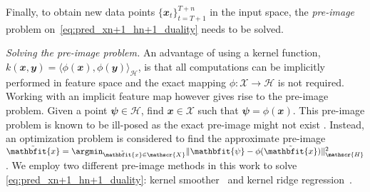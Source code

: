 
Finally, to obtain new data points $ \{\mathbfit{x}_t\}_{t=T+1} ^{T+n} $ in the input space, the \emph{pre-image} problem on~\eqref{eq:pred_xn+1_hn+1_duality} needs to be solved.

\emph{Solving the pre-image problem.} An advantage of using a kernel function, $ k(\mathbfit{x},\mathbfit{y}) = \langle\phi(\mathbfit{x}), \phi(\mathbfit{y}) \rangle_{\mathscr{H}} $, is that all computations can be implicitly performed in feature space and the exact mapping $\phi: \mathscr{X} \rightarrow \mathscr{H}$ is not required. Working with an implicit feature map however gives rise to the pre-image problem.
Given a point $\mathbfit{\psi} \in \mathscr{H}$, find $ \mathbfit{x} \in \mathscr{X}$ such that $\mathbfit{\psi }= \phi(\mathbfit{x})$.
This pre-image problem is known to be ill-posed as the exact pre-image might not exist \cite{Scholkopf2001}. Instead, an optimization problem is considered to find the approximate pre-image $\tilde{\mathbfit{x}} = \argmin_{\tilde{\mathbfit{x}} \in \mathscr{X}}\|\mathbfit{\psi}-\phi(\tilde{\mathbfit{x}})\|^{2}_{\mathscr{H}}$.
We employ two different pre-image methods in this work to solve \eqref{eq:pred_xn+1_hn+1_duality}: kernel smoother~\cite{joachim} and kernel ridge regression~\cite{weston_learning_2004}.

